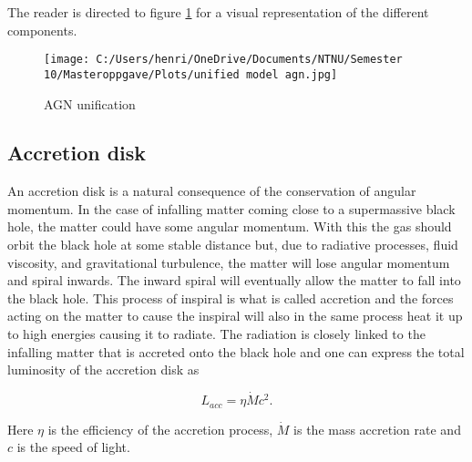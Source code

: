 The reader is directed to figure \ref{fig:my_label} for a visual representation of the different components.


\begin{figure}
    \centering
    \texttt{[image: C:/Users/henri/OneDrive/Documents/NTNU/Semester 10/Masteroppgave/Plots/unified model agn.jpg]}
    \caption{AGN unification}
    \label{fig:my_label}
\end{figure}

\subsection{Accretion disk}
An accretion disk is a natural consequence of the conservation of angular momentum. In the case of infalling 
matter coming close to a supermassive black hole, the matter could have some angular momentum. With this the gas should orbit the black hole at some stable distance but, due to radiative processes, fluid viscosity, and gravitational turbulence, 
the matter will lose angular momentum and spiral inwards. The inward spiral will eventually allow the matter to fall into the black hole. 
This process of inspiral is what is called accretion and the forces acting on the matter to cause the inspiral 
will also in the same process heat it up to high energies causing it to radiate. The radiation is closely linked to the 
infalling matter that is accreted onto the black hole and one can express the total luminosity of the accretion disk as 

\begin{equation}
    L_{acc} = \eta \dot{M}c^2.
    \label{eq:accretion_luminosity}
\end{equation}

Here $\eta$ is the efficiency of the accretion process, $\dot{M}$ is the mass accretion rate and $c$ is the speed of light.




